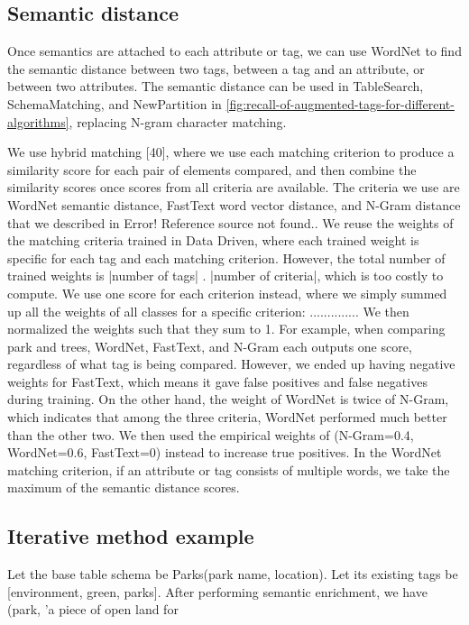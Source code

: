 \subsection{Semantic distance}

Once semantics are attached to each attribute or tag, we can use WordNet to find the semantic distance between two tags, between a tag and an attribute, or between two attributes. The semantic distance can be used in TableSearch, SchemaMatching, and NewPartition in \autoref{fig:recall-of-augmented-tags-for-different-algorithms}, replacing N-gram character matching.

We use hybrid matching \cite{Rahm2001Survey}[40], where we use each matching criterion to produce a similarity score for each pair of elements compared, and then combine the similarity scores once scores from all criteria are available. The criteria we use are WordNet semantic distance, FastText word vector distance, and N-Gram distance that we described in Error! Reference source not found.. We reuse the weights of the matching criteria trained in Data Driven, where each trained weight is specific for each tag and each matching criterion. However, the total number of trained weights is |number of tags| . |number of criteria|, which is too costly to compute. We use one score for each criterion instead, where we simply summed up all the weights of all classes for a specific criterion: ..............
We then normalized the weights such that they sum to 1. For example, when comparing park and trees, WordNet, FastText, and N-Gram each outputs one score, regardless of what tag is being compared. However, we ended up having negative weights for FastText, which means it gave false positives and false negatives during training. On the other hand, the weight of WordNet is twice of N-Gram, which indicates that among the three criteria, WordNet performed much better than the other two. We then used the empirical weights of (N-Gram=0.4, WordNet=0.6, FastText=0) instead to increase true positives. In the WordNet matching criterion, if an attribute or tag consists of multiple words, we take the maximum of the semantic distance scores.

\subsection{Iterative method example}
\label{ssec:IterativeMethodExample2}

Let the base table schema be Parks(park name, location). Let its existing tags be [environment, green, parks]. After performing semantic enrichment, we have (park, 'a piece of open land for

